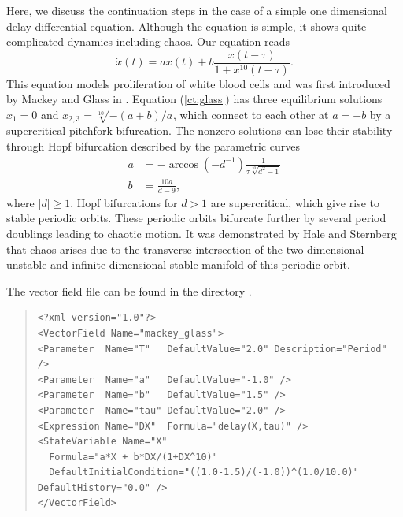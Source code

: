 \documentclass[10pt,a4paper]{ddedoc}
\begin{document}
Here, we discuss the continuation steps in the case of a simple one dimensional
delay-differential equation. Although the equation is simple, it shows quite
complicated dynamics including chaos. Our equation reads
\begin{equation}
  \dot{x} ( t ) = ax ( t ) + b \frac{x ( t - \tau )}{1 + x^{10} ( t - \tau )}.
\label{ct:glass}
\end{equation}
This equation models proliferation of white blood cells and was first
introduced by Mackey and Glass in {\cite{mackey}}. Equation (\ref{ct:glass})
has three equilibrium solutions $x_1 = 0$ and $x_{2, 3} = \sqrt[10]{- ( a + b
) / a}$, which connect to each other at $a = - b$ by a supercritical pitchfork
bifurcation. The nonzero solutions can lose their stability through Hopf
bifurcation described by the parametric curves
\begin{align*}
  a & =-\arccos(-d^{-1}){\frac{1}{{\tau} {\sqrt[10]{d^2-1}}}}\\
  b & ={\frac{10a}{d-9}},
\end{align*}
where $|d| \ge 1$. Hopf bifurcations for $d > 1$ are supercritical, which give
rise to stable periodic orbits. These periodic orbits bifurcate further by
several period doublings leading to chaotic motion. It was demonstrated by
Hale and Sternberg {\cite{sternberg}} that chaos arises due to the transverse
intersection of the two-dimensional unstable and infinite dimensional stable
manifold of this periodic orbit.

The vector field file can be found in the directory . 
{ \small \begin{quote} \begin{lstlisting}[basicstyle=\tt,frame=single]
<?xml version="1.0"?>
<VectorField Name="mackey_glass">
<Parameter  Name="T"   DefaultValue="2.0" Description="Period" />
<Parameter  Name="a"   DefaultValue="-1.0" />
<Parameter  Name="b"   DefaultValue="1.5" />
<Parameter  Name="tau" DefaultValue="2.0" />
<Expression Name="DX"  Formula="delay(X,tau)" />
<StateVariable Name="X" 
  Formula="a*X + b*DX/(1+DX^10)"
  DefaultInitialCondition="((1.0-1.5)/(-1.0))^(1.0/10.0)" DefaultHistory="0.0" />
</VectorField>
\end{lstlisting} \end{quote} } \noindent
\end{document}
